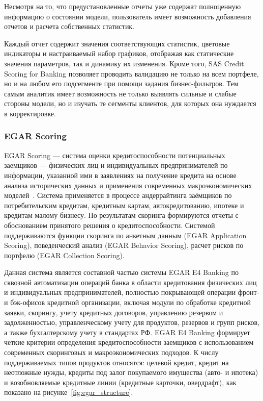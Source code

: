 Несмотря на то, что предустановленные отчеты уже содержат полноценную информацию о состоянии модели,
пользователь имеет возможность добавления отчетов и расчета собственных статистик.

Каждый отчет содержит значения соответствующих статистик, цветовые индикаторы и настраиваемый набор графиков,
отображая как статические значения параметров, так и динамику их изменения.
Кроме того, SAS Credit Scoring for Banking позволяет проводить валидацию не только на всем портфеле,
но и на любом его подсегменте при помощи задания бизнес-фильтров.
Тем самым аналитик имеет возможность не только выявлять сильные и слабые стороны модели,
но и изучать те сегменты клиентов, для которых она нуждается в корректировке.

\subsubsection{EGAR Scoring}

EGAR Scoring --- система оценки кредитоспособности потенциальных заемщиков ---
физических лиц и индивидуальных предпринимателей по информации,
указанной ими в заявлениях на получение кредита на основе анализа
исторических данных и применения современных макроэкономических моделей~\cite{egar_scoring}.
Система применяется в процессе андеррайтинга заёмщиков по потребительским кредитам,
кредитным картам, автокредитованию, ипотеке и кредитам малому бизнесу.
По результатам скоринга формируются отчеты с обоснованием принятого
решения о кредитоспособности.
Системой поддерживаются функции
скоринга по анкетным данным (EGAR Application Scoring),
поведенческий анализ (EGAR Behavior Scoring),
расчет рисков по портфелю (EGAR Collection Scoring).

Данная система является составной частью системы EGAR E4 Banking
по сквозной автоматизации операций банка в области кредитования физических лиц
и индивидуальных предпринимателей,
полностью покрывающей операции фронт- и бэк-офисов кредитной организации,
включая модули по обработке кредитной заявки, скорингу, учету кредитных договоров,
управлению резервом и задолженностью, управленческому учету для продуктов,
резервов и групп рисков, а также бухгалтерскому учету в стандартах РФ.
EGAR E4 Banking формирует четкие критерии определения кредитоспособности
заемщиков с использованием современных скоринговых и макроэкономических подходов.
К числу поддерживаемых типов продуктов относятся: целевой кредит, кредит на неотложные нужды,
кредиты под залог покупаемого имущества (авто- и ипотека)
и возобновляемые кредитные линии (кредитные карточки, овердрафт),
как показано на рисунке~\ref{fig:egar_structure}.


